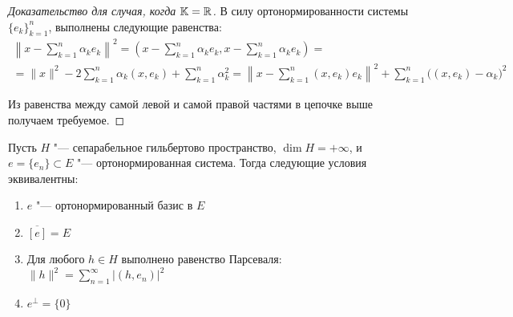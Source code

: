 \begin{proof}[Доказательство для случая, когда {$\mathbb{K} = \mathbb{R}$}]
	В силу ортонормированности системы $\{e_k\}_{k = 1}^n$, выполнены следующие равенства:
	\begin{multline*}
		\left\|x - \sum_{k = 1}^n \alpha_ke_k\right\|^2
		=
		\left(x - \sum_{k = 1}^n \alpha_ke_k, x - \sum_{k = 1}^n \alpha_ke_k\right)
		= 
		\\
		=
		\|x\|^2 - 2\sum_{k = 1}^n\alpha_k(x, e_k) + \sum_{k = 1}^n\alpha_k^2 = \left\|x - \sum_{k = 1}^n(x, e_k)e_k\right\|^2 + \sum_{k = 1}^n\big((x, e_k) - \alpha_k\big)^2
	\end{multline*}

	Из равенства между самой левой и самой правой частями в цепочке выше получаем требуемое.
\end{proof}

\begin{theorem}\label{thm4.4}
	Пусть $H$ "--- сепарабельное гильбертово пространство, $\dim{H} = +\infty$, и ${e = \{e_n\} \subset E}$ "--- ортонормированная система. Тогда следующие условия эквивалентны:
	\begin{enumerate}
		\item $e$ "--- ортонормированный базис в $E$
  		\item $\overline{[e]} = E$
    	\item Для любого $h \in H$ выполнено равенство Парсеваля: $\|h\|^2 = \sum_{n = 1}^\infty |(h, e_n)|^2$
    	\item $e^\perp = \{0\}$
	\end{enumerate}
\end{theorem}

